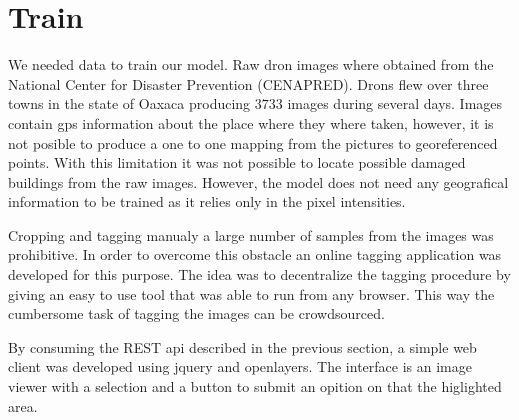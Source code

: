 \section{Train}

We needed data to train our model. Raw dron images where obtained from the National Center for Disaster Prevention (CENAPRED). Drons flew over three towns in the state of Oaxaca producing $3733$ images during several days. Images contain gps information about the place where they where taken, however, it is not posible to produce a one to one mapping from the pictures to georeferenced points. With this limitation it was not possible to locate possible damaged buildings from the raw images. However, the model does not need any geografical information to be trained as it relies only in the pixel intensities.

Cropping and tagging manualy a large number of samples from the images was prohibitive. In order to overcome this obstacle an online tagging application was developed for this purpose. The idea was to decentralize the tagging procedure by giving an easy to use tool that was able to run from any browser. This way the cumbersome task of tagging the images can be crowdsourced.

By consuming the REST api described in the previous section, a simple web client was developed using jquery and openlayers. The interface is an image viewer with a selection and a button to submit an opition on that the higlighted area.

\begin{figure}[h]
  \begin{center}
  \end{center}
\end{figure}

\begin{figure}[h]
  \begin{center}
  \end{center}
\end{figure}

\begin{figure}[h]
  \begin{center}
  \end{center}
\end{figure}

